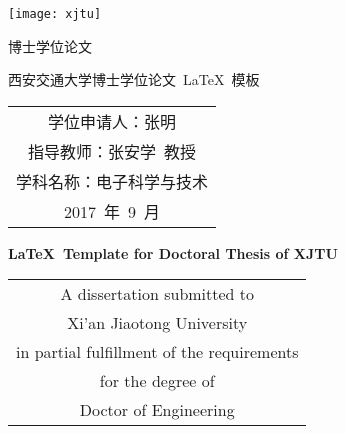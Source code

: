 
\begin{titlepage}
	\begin{center}
		\begin{figure*}[!ht]\vspace{5em}
			\centering
			\texttt{[image: xjtu]}
		\end{figure*}
		
		\vspace{1.5em}
		\begin{center} {\erhao 博士学位论文}\end{center}
		
		\vspace{8em}
		\begin{center} {\sanhao\hei 西安交通大学博士学位论文~\LaTeX~模板}\end{center}
		
		\vspace{16em}
		{\sanhao
			\begin{center} \renewcommand{\arraystretch}{1.7}
				\begin{tabular}{c}
					学位申请人：张明 \\
					指导教师：张安学~教授 \\
					学科名称：电子科学与技术 \\
					2017~年~9~月 \\
				\end{tabular} \renewcommand{\arraystretch}{1}
			\end{center} 
		}
	\end{center}
	\clearpage{\pagestyle{empty}\cleardoublepage}
	
	\newpage\thispagestyle{empty}
	\begin{center}
		\parbox[t][0cm][t]{\textwidth}{}
		\parbox[t][1cm][t]{\textwidth}{\sanhao
			\begin{center} {\bfseries \LaTeX~Template for Doctoral Thesis of XJTU}\end{center} }
		
		\vspace{5cm}
		{\sanhao
			\begin{center} \renewcommand{\arraystretch}{1.4}
				\begin{tabular}{c}
					A dissertation submitted to  \\
					Xi'an Jiaotong University \\
					in partial fulfillment of the requirements \\
					for the degree of \\
					Doctor of Engineering \\
				\end{tabular} \renewcommand{\arraystretch}{1}
			\end{center} 
		}
			

\end{center}
\end{titlepage}
